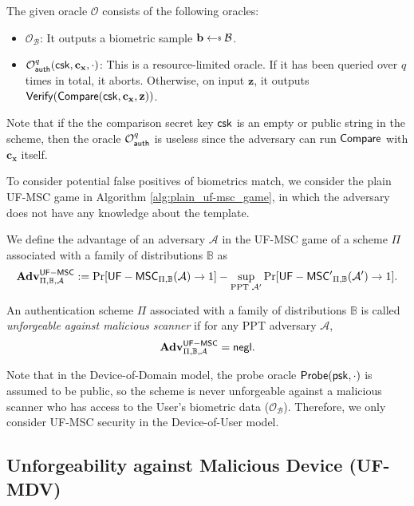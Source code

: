 The given oracle $\mathcal{O}$ consists of the following oracles:

\begin{itemize}
	\item $\mathcal{O}_{\mathcal{B}}$: It outputs a biometric sample $\mathbf{b} \getsdollar \mathcal{B}$.

	\item $\mathcal{O}_{\sf auth}^{q}({\sf csk}, \mathbf{c_x}, \cdot)$: This is a resource-limited oracle. If it has been queried over $q$ times in total, it aborts. Otherwise, on input $\mathbf{z}$, it outputs ${\sf Verify}({\sf Compare}({\sf csk}, \mathbf{c_x}, \mathbf{z}))$.
\end{itemize}

Note that if the the comparison secret key ${\sf csk}$ is an empty or public string in the scheme, then the oracle $\mathcal{O}_{\sf auth}^{q}$ is useless since the adversary can run $\sf Compare$ with $\mathbf{c_x}$ itself.

To consider potential false positives of biometrics match, we consider the plain UF-MSC game in Algorithm \ref{alg:plain_uf-msc_game}, in which the adversary does not have any knowledge about the template.

We define the advantage of an adversary $\mathcal{A}$ in the UF-MSC game of a scheme $\Pi$ associated with a family of distributions $\mathbb{B}$ as
\[
	\mathbf{Adv}^{\sf UF-MSC}_{\Pi, \mathbb{B}, \mathcal{A}} := \Pr[{\sf UF-MSC}_{\Pi, \mathbb{B}}(\mathcal{A}) \to 1] -
	\sup_{\text{PPT } \mathcal{A'}} \Pr[{\sf UF-MSC'}_{\Pi, \mathbb{B}}(\mathcal{A'}) \to 1].
\]

An authentication scheme $\Pi$ associated with a family of distributions $\mathbb{B}$ is called \emph{unforgeable against malicious scanner} if for any PPT adversary $\mathcal{A}$,
\[
	\mathbf{Adv}^{\sf UF-MSC}_{\Pi, \mathbb{B}, \mathcal{A}} = \mathsf{negl}.
\]

Note that in the Device-of-Domain model, the probe oracle ${\sf Probe}({\sf psk}, \cdot)$ is assumed to be public, so the scheme is never unforgeable against a malicious scanner who has access to the {\sf User}'s biometric data ($\mathcal{O}_{\mathcal{B}}$). Therefore, we only consider {\sf UF-MSC} security in the Device-of-User model. 



\subsection{Unforgeability against Malicious Device (UF-MDV)}
\label{sec:uf-mdv_game}

